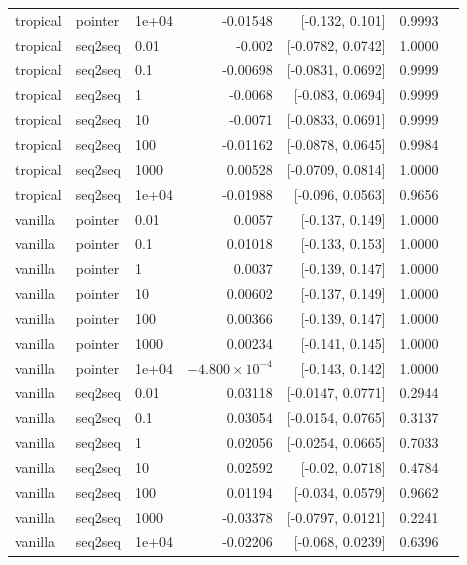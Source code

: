 \documentclass[10pt]{article}
\begin{document}
{\begin{longtable}{lllrrrl}
tropical & pointer & 1e+04 & -0.01548 & [-0.132, 0.101] & 0.9993 & \\
tropical & seq2seq & 0.01 & -0.002 & [-0.0782, 0.0742] & 1.0000 & \\
tropical & seq2seq & 0.1 & -0.00698 & [-0.0831, 0.0692] & 0.9999 & \\
tropical & seq2seq & 1 & -0.0068 & [-0.083, 0.0694] & 0.9999 & \\
tropical & seq2seq & 10 & -0.0071 & [-0.0833, 0.0691] & 0.9999 & \\
tropical & seq2seq & 100 & -0.01162 & [-0.0878, 0.0645] & 0.9984 & \\
tropical & seq2seq & 1000 & 0.00528 & [-0.0709, 0.0814] & 1.0000 & \\
tropical & seq2seq & 1e+04 & -0.01988 & [-0.096, 0.0563] & 0.9656 & \\
vanilla & pointer & 0.01 & 0.0057 & [-0.137, 0.149] & 1.0000 & \\
vanilla & pointer & 0.1 & 0.01018 & [-0.133, 0.153] & 1.0000 & \\
vanilla & pointer & 1 & 0.0037 & [-0.139, 0.147] & 1.0000 & \\
vanilla & pointer & 10 & 0.00602 & [-0.137, 0.149] & 1.0000 & \\
vanilla & pointer & 100 & 0.00366 & [-0.139, 0.147] & 1.0000 & \\
vanilla & pointer & 1000 & 0.00234 & [-0.141, 0.145] & 1.0000 & \\
vanilla & pointer & 1e+04 & $-4.800\times10^{-4}$ & [-0.143, 0.142] & 1.0000 & \\
vanilla & seq2seq & 0.01 & 0.03118 & [-0.0147, 0.0771] & 0.2944 & \\
vanilla & seq2seq & 0.1 & 0.03054 & [-0.0154, 0.0765] & 0.3137 & \\
vanilla & seq2seq & 1 & 0.02056 & [-0.0254, 0.0665] & 0.7033 & \\
vanilla & seq2seq & 10 & 0.02592 & [-0.02, 0.0718] & 0.4784 & \\
vanilla & seq2seq & 100 & 0.01194 & [-0.034, 0.0579] & 0.9662 & \\
vanilla & seq2seq & 1000 & -0.03378 & [-0.0797, 0.0121] & 0.2241 & \\
vanilla & seq2seq & 1e+04 & -0.02206 & [-0.068, 0.0239] & 0.6396 & \\
\bottomrule
\end{longtable}
}
\end{document}

